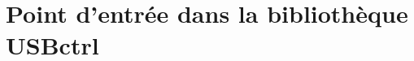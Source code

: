 \documentclass[10pt,french,twoside,a4paper]{report}
\begin{document}
\chapter{Point d'entrée dans la bibliothèque USBctrl}\label{annexe_1}

%
%
%
%

\cleardoublepage


\end{document}
